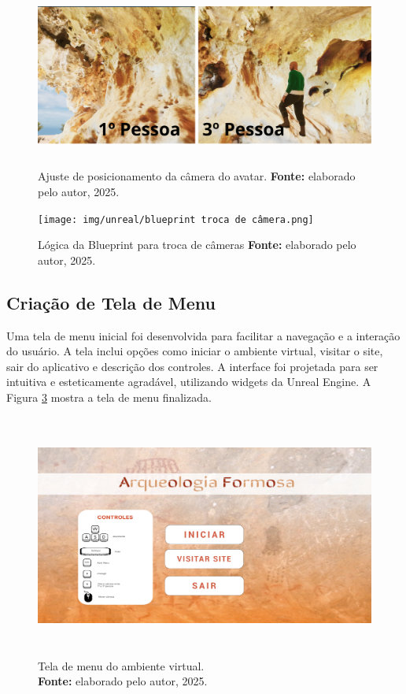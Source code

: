 \begin{figure}[H]
        \centering
        \includegraphics[height=6cm, keepaspectratio]{img/unreal/1 pessoa e 3 pessoa comparacao.png}
        \caption{Ajuste de posicionamento da câmera do avatar.
            \textbf{Fonte:} elaborado pelo autor, 2025.}
        \label{fig:alternarcamera}
\end{figure}

\begin{figure}[H]
        \centering
        \texttt{[image: img/unreal/blueprint troca de câmera.png]}
        \caption{Lógica da Blueprint para troca de câmeras
            \textbf{Fonte:} elaborado pelo autor, 2025.}
        \label{fig:blueprint_camera}
\end{figure}

\subsection{Criação de Tela de Menu}
Uma tela de menu inicial foi desenvolvida para facilitar a navegação e a interação do usuário. A tela inclui opções como iniciar o ambiente virtual, visitar o site, sair do aplicativo e descrição dos controles.
A interface foi projetada para ser intuitiva e esteticamente agradável, utilizando widgets da Unreal Engine. A Figura \ref{fig:tela_menu} mostra a tela de menu finalizada.

\begin{figure}[H]
        \centering
        \includegraphics[height=8cm, keepaspectratio]{img/unreal/menu com controles.png}
        \caption{Tela de menu do ambiente virtual. \\
            \textbf{Fonte:} elaborado pelo autor, 2025.}
        \label{fig:tela_menu}
\end{figure}


